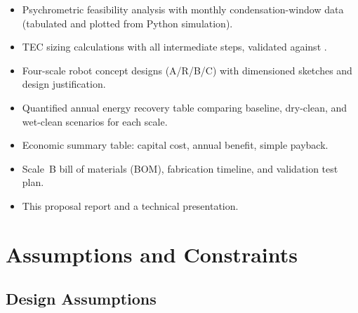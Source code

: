 \documentclass[12pt,a4paper]{report}
\numberwithin{equation}{chapter}
\numberwithin{figure}{chapter}
\numberwithin{table}{chapter}
\begin{document}
\begin{itemize}[leftmargin=*]
  \item Psychrometric feasibility analysis with monthly condensation-window data
        (tabulated and plotted from Python simulation).
  \item TEC sizing calculations with all intermediate steps, validated against
        \cite{eslami2021tec,alqaed2023awg,shourideh2021tec}.
  \item Four-scale robot concept designs (A/R/B/C) with dimensioned sketches and design
        justification.
  \item Quantified annual energy recovery table comparing baseline, dry-clean, and
        wet-clean scenarios for each scale.
  \item Economic summary table: capital cost, annual benefit, simple payback.
  \item Scale~B bill of materials (BOM), fabrication timeline, and validation test plan.
  \item This proposal report and a technical presentation.
\end{itemize}

\chapter{Assumptions and Constraints}

\section{Design Assumptions}
\end{document}
